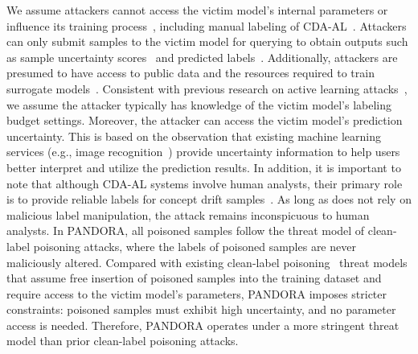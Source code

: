 We assume attackers cannot access the victim model's internal parameters or influence its training process~\cite{2017-ASIACCS-Black-Box-Attack}, including manual labeling of CDA-AL~\cite{2023-Usenix-chenyizhen}.
Attackers can only submit samples to the victim model for querying to obtain outputs such as sample uncertainty scores~\cite{2025-Baidu-Image-Recognition} and predicted labels~\cite{Virustotaluploadinterface}.
Additionally, attackers are presumed to have access to public data and the resources required to train surrogate models~\cite{2023-AAAI-surrogate-model-for-adversarial-attack}.
Consistent with previous research on active learning attacks~\cite{2021-Usenix-active-learning-backdoor}, we assume the attacker typically has knowledge of the victim model's labeling budget settings. %
Moreover, the attacker can access the victim model’s prediction uncertainty.
This is based on the observation that existing machine learning services (e.g., image recognition~\cite{2025-Baidu-Image-Recognition}) provide uncertainty information to help users better interpret and utilize the prediction results.
In addition, it is important to note that although CDA-AL systems involve human analysts, their primary role is to provide reliable labels for concept drift samples~\cite{2023-Usenix-chenyizhen}.
As long as \pandora does not rely on malicious label manipulation, the attack remains inconspicuous to human analysts.
In PANDORA, all poisoned samples follow the threat model of clean-label poisoning attacks, where the labels of poisoned samples are never maliciously altered.
Compared with existing clean-label poisoning~\cite{2018-NIPS-Poison-frogs} threat models that assume free insertion of poisoned samples into the training dataset and require access to the victim model’s parameters, PANDORA imposes stricter constraints: poisoned samples must exhibit high uncertainty, and no parameter access is needed.
Therefore, PANDORA operates under a more stringent threat model than prior clean-label poisoning attacks.